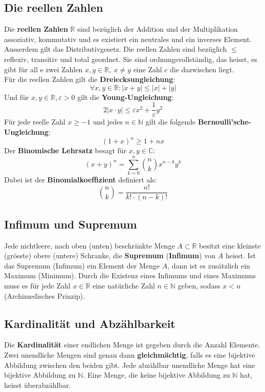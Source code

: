 \documentclass[a4paper,10pt]{scrartcl}
\begin{document}
\subsection{Die reellen Zahlen}
Die \textbf{reellen Zahlen} $\mathbb{R}$ sind bezüglich der Addition und der Multiplikation assoziativ, kommutativ und es existiert ein neutrales und ein inverses Element. Ausserdem gilt das Distributivgesetz. Die reellen Zahlen sind bezüglich $\leq$ reflexiv, transitiv und total geordnet. Sie sind ordnungsvollständig, das heisst, es gibt für all e zwei Zahlen $x,y\in \mathbb{R}, \ x \neq y$ eine Zahl $c$ die dazwischen liegt. \\
Für die reellen Zahlen gilt die \textbf{Dreiecksungleichung}: 
\begin{equation}
	\forall x,y\in \mathbb{R}: |x+y|\leq |x| + |y|
\end{equation}
Und für $x,y\in \mathbb{R}, \varepsilon>0$ gilt die \textbf{Young-Ungleichung}:
\begin{equation}
	2|x\cdot y| \leq \varepsilon x^2  + \frac{1}{\varepsilon} y^2
\end{equation}
Für jede reelle Zahl $x\geq -1$ und jedes $n\in\mathbb{N}$ gilt die folgende \textbf{Bernoulli'sche-Ungleichung}: \\
\begin{equation}
(1+x)^{n}\geq 1+nx
\end{equation}
Der \textbf{Binomische Lehrsatz} besagt für $x,y\in\mathbb{C}$:
\begin{equation}
\displaystyle (x+y)^{n}=\sum _{k=0}^{n}{\binom {n}{k}}x^{n-k}y^{k}
\end{equation}
Dabei ist der \textbf{Binomialkoeffizient} definiert als: 
\begin{equation} 
{\binom {n}{k}}={\frac {n!}{k!\cdot (n-k)!}}
\end{equation}

\subsection{Infimum und Supremum}
Jede nichtleere, nach oben (unten) beschränkte Menge $A\subset \mathbb{R}$ besitzt eine kleinste (grösste) obere (untere) Schranke, die \textbf{Supremum} (\textbf{Infimum}) von $A$ heisst. Ist das Supremum (Infimum) ein Element der Menge $A$, dann ist es zusätzlich ein Maximum (Minimum). Durch die Existenz eines Infimums und eines Maximums muss es für jede Zahl $x\in\mathbb{R}$ eine natürliche Zahl $n\in \mathbb{N}$ geben, sodass $x<n$ (Archimedisches Prinzip).
\subsection{Kardinalität und Abzählbarkeit}
Die \textbf{Kardinalität} einer endlichen Menge ist gegeben durch die Anzahl Elemente. Zwei unendliche Mengen sind genau dann \textbf{gleichmächtig}, falls es eine bijektive Abbildung zwischen den beiden gibt. Jede abzählbar unendliche Menge hat eine bijektive Abbildung zu $\mathbb{N}$. Eine Menge, die keine bijektive Abbildung zu $\mathbb{N}$ hat, heisst überabzählbar.
\end{document}
